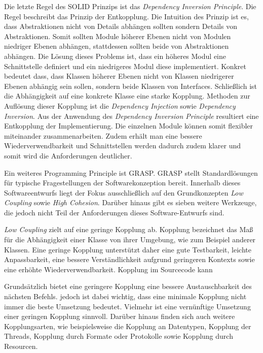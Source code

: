 Die letzte Regel des SOLID Prinzips ist das \textit{Dependency Inversion Principle}.
Die Regel beschreibt das Prinzip der Entkopplung.
Die Intuition des Prinzip ist es, dass Abstraktionen nicht von Details abhängen sollten sondern Details von Abstraktionen.
Somit sollten Module höherer Ebenen nicht von Modulen niedriger Ebenen abhängen, stattdessen sollten beide von Abstraktionen abhängen.
Die Lösung dieses Problems ist, dass ein höheres Modul eine Schnittstelle definiert und ein niedrigeres Modul diese implementiert.
Konkret bedeutet dass, dass Klassen höherer Ebenen nicht von Klassen niedrigerer Ebenen abhängig sein sollen, sondern beide Klassen von Interfaces.
Schließlich ist die Abhängigkeit auf eine konkrete Klasse eine starke Kopplung.
Methoden zur Auflösung dieser Kopplung ist die \textit{Dependency Injection} sowie \textit{Dependency Inversion}.
Aus der Anwendung des \textit{Dependency Inversion Principle} resultiert eine Entkopplung der Implementierung.
Die einzelnen Module können somit flexibler miteinander zusammenarbeiten.
Zudem erhält man eine bessere Wiederverwendbarkeit und Schnittstellen werden dadurch zudem klarer und somit wird die Anforderungen deutlicher.

Ein weiteres Programming Principle ist \ac{GRASP}.
\ac{GRASP} stellt Standardlösungen für typische Fragestellungen der Softwarekonzeption bereit.
Innerhalb dieses Softwareentwurfs liegt der Fokus ausschließlich auf den Grundkonzepten \textit{Low Coupling} sowie \textit{High Cohesion}.
Darüber hinaus gibt es sieben weitere Werkzeuge, die jedoch nicht Teil der Anforderungen dieses Software-Entwurfs sind.

\textit{Low Coupling} zielt auf eine geringe Kopplung ab.
Kopplung bezeichnet das Maß für die Abhängigkeit einer Klasse von ihrer Umgebung, wie zum Beispiel anderer Klassen.
Eine geringe Kopplung unterstützt daher eine gute Testbarkeit, leichte Anpassbarkeit, eine bessere Verständlichkeit aufgrund geringeren Kontexts sowie eine erhöhte Wiederverwendbarkeit.
Kopplung im Sourcecode kann

Grundsätzlich bietet eine geringere Kopplung eine bessere Austauschbarkeit des nächsten Befehls.
jedoch ist dabei wichtig, dass eine minimale Kopplung nicht immer die beste Umsetzung bedeutet.
Vielmehr ist eine vernünftige Umsetzung einer geringen Kopplung sinnvoll.
Darüber hinaus finden sich auch weitere Kopplungsarten, wie beispielsweise die Kopplung an Datentypen, Kopplung der Threads, Kopplung durch Formate oder Protokolle sowie Kopplung durch Resourcen.

